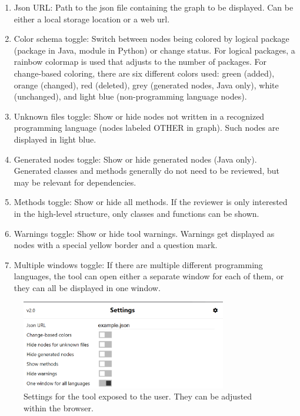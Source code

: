 \documentclass[a4paper,11pt,twoside]{article}
\theoremstyle{definition} %
\begin{document}
\begin{enumerate}
 \item Json URL: Path to the json file containing the graph to be displayed. Can be either a local storage location or a web url.
 \item Color schema toggle: Switch between nodes being colored by logical package (package in Java, module in Python) or change status. For logical packages, a rainbow colormap is used that adjusts to the number of packages. For change-based coloring, there are six different colors used: green (added), orange (changed), red (deleted), grey (generated nodes, Java only), white (unchanged), and light blue (non-programming language nodes). 
 \item Unknown files toggle: Show or hide nodes not written in a recognized programming language (nodes labeled OTHER in graph). Such nodes are displayed in light blue. 
 \item Generated nodes toggle: Show or hide generated nodes (Java only). Generated classes and methods generally do not need to be reviewed, but may be relevant for dependencies. 
 \item Methods toggle: Show or hide all methods. If the reviewer is only interested in the high-level structure, only classes and functions can be shown. 
 \item Warnings toggle: Show or hide tool warnings. Warnings get displayed as nodes with a special yellow border and a question mark. 
 \item Multiple windows toggle: If there are multiple different programming languages, the tool can open either a separate window for each of them, or they can all be displayed in one window. 
\end{enumerate}

\begin{figure}[h]
    \centering
    \includegraphics[width=0.8\textwidth]{Subfigures/settings.PNG}
    \caption{Settings for the tool exposed to the user. They can be adjusted within the browser.}
    \label{fig:CDVSettings}
\end{figure}
\end{document}
